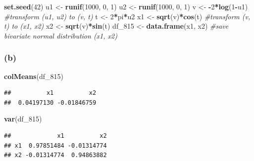 \documentclass[
]{article}
\newenvironment{Shaded}{\begin{snugshade}}{\end{snugshade}}
\newcommand{\CommentTok}[1]{\textcolor[rgb]{0.56,0.35,0.01}{\textit{#1}}}
\newcommand{\DecValTok}[1]{\textcolor[rgb]{0.00,0.00,0.81}{#1}}
\newcommand{\FunctionTok}[1]{\textcolor[rgb]{0.13,0.29,0.53}{\textbf{#1}}}
\newcommand{\NormalTok}[1]{#1}
\newcommand{\OtherTok}[1]{\textcolor[rgb]{0.56,0.35,0.01}{#1}}
\newcommand{\SpecialCharTok}[1]{\textcolor[rgb]{0.81,0.36,0.00}{\textbf{#1}}}
\begin{document}
\begin{Shaded}
\begin{Highlighting}[]
\FunctionTok{set.seed}\NormalTok{(}\DecValTok{42}\NormalTok{)}
\NormalTok{u1 }\OtherTok{\textless{}{-}} \FunctionTok{runif}\NormalTok{(}\DecValTok{1000}\NormalTok{, }\DecValTok{0}\NormalTok{, }\DecValTok{1}\NormalTok{)}
\NormalTok{u2 }\OtherTok{\textless{}{-}} \FunctionTok{runif}\NormalTok{(}\DecValTok{1000}\NormalTok{, }\DecValTok{0}\NormalTok{, }\DecValTok{1}\NormalTok{)}
\NormalTok{v }\OtherTok{\textless{}{-}} \SpecialCharTok{{-}}\DecValTok{2}\SpecialCharTok{*}\FunctionTok{log}\NormalTok{(}\DecValTok{1}\SpecialCharTok{{-}}\NormalTok{u1) }\CommentTok{\#transform (u1, u2) to (v, t)}
\NormalTok{t }\OtherTok{\textless{}{-}} \DecValTok{2}\SpecialCharTok{*}\NormalTok{pi}\SpecialCharTok{*}\NormalTok{u2}
\NormalTok{x1 }\OtherTok{\textless{}{-}} \FunctionTok{sqrt}\NormalTok{(v)}\SpecialCharTok{*}\FunctionTok{cos}\NormalTok{(t) }\CommentTok{\#transform (v, t) to (x1, x2)}
\NormalTok{x2 }\OtherTok{\textless{}{-}} \FunctionTok{sqrt}\NormalTok{(v)}\SpecialCharTok{*}\FunctionTok{sin}\NormalTok{(t)}
\NormalTok{df\_815 }\OtherTok{\textless{}{-}} \FunctionTok{data.frame}\NormalTok{(x1, x2) }\CommentTok{\#save bivariate normal distribution (x1, x2)}
\end{Highlighting}
\end{Shaded}

\subsubsection{(b)}\label{b-4}

\begin{Shaded}
\begin{Highlighting}[]
\FunctionTok{colMeans}\NormalTok{(df\_815) }
\end{Highlighting}
\end{Shaded}

\begin{verbatim}
##          x1          x2 
##  0.04197130 -0.01846759
\end{verbatim}

\begin{Shaded}
\begin{Highlighting}[]
\FunctionTok{var}\NormalTok{(df\_815)}
\end{Highlighting}
\end{Shaded}

\begin{verbatim}
##             x1          x2
## x1  0.97851484 -0.01314774
## x2 -0.01314774  0.94863882
\end{verbatim}
\end{document}

